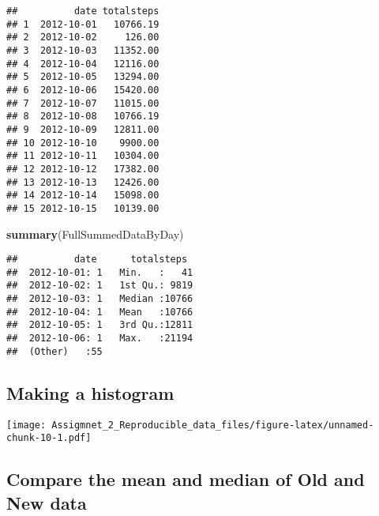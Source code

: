 \documentclass[]{article}
\newenvironment{Shaded}{\begin{snugshade}}{\end{snugshade}}
\newcommand{\KeywordTok}[1]{\textcolor[rgb]{0.13,0.29,0.53}{\textbf{#1}}}
\newcommand{\DataTypeTok}[1]{\textcolor[rgb]{0.13,0.29,0.53}{#1}}
\newcommand{\DecValTok}[1]{\textcolor[rgb]{0.00,0.00,0.81}{#1}}
\newcommand{\StringTok}[1]{\textcolor[rgb]{0.31,0.60,0.02}{#1}}
\newcommand{\OperatorTok}[1]{\textcolor[rgb]{0.81,0.36,0.00}{\textbf{#1}}}
\newcommand{\NormalTok}[1]{#1}
\begin{document}
\begin{verbatim}
##          date totalsteps
## 1  2012-10-01   10766.19
## 2  2012-10-02     126.00
## 3  2012-10-03   11352.00
## 4  2012-10-04   12116.00
## 5  2012-10-05   13294.00
## 6  2012-10-06   15420.00
## 7  2012-10-07   11015.00
## 8  2012-10-08   10766.19
## 9  2012-10-09   12811.00
## 10 2012-10-10    9900.00
## 11 2012-10-11   10304.00
## 12 2012-10-12   17382.00
## 13 2012-10-13   12426.00
## 14 2012-10-14   15098.00
## 15 2012-10-15   10139.00
\end{verbatim}

\begin{Shaded}
\begin{Highlighting}[]
\KeywordTok{summary}\NormalTok{(FullSummedDataByDay)}
\end{Highlighting}
\end{Shaded}

\begin{verbatim}
##          date      totalsteps   
##  2012-10-01: 1   Min.   :   41  
##  2012-10-02: 1   1st Qu.: 9819  
##  2012-10-03: 1   Median :10766  
##  2012-10-04: 1   Mean   :10766  
##  2012-10-05: 1   3rd Qu.:12811  
##  2012-10-06: 1   Max.   :21194  
##  (Other)   :55
\end{verbatim}

\subsection{Making a histogram}\label{making-a-histogram}

\begin{Shaded}
\end{Shaded}

\texttt{[image: Assigmnet\_2\_Reproducible\_data\_files/figure-latex/unnamed-chunk-10-1.pdf]}

\subsection{Compare the mean and median of Old and New
data}\label{compare-the-mean-and-median-of-old-and-new-data}
\end{document}
